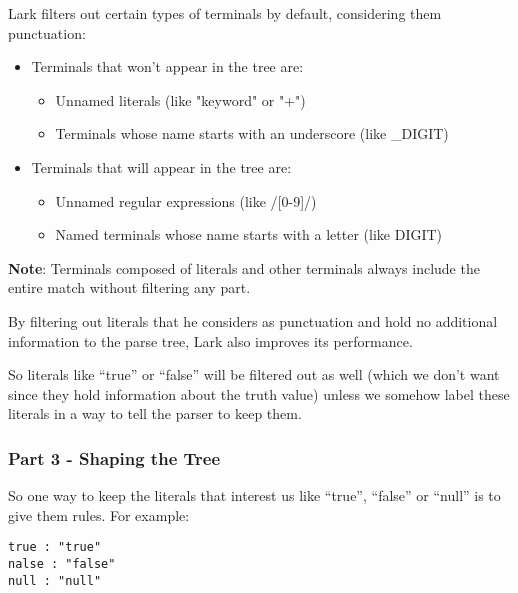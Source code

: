 \documentclass[12pt]{article}
\begin{document}
Lark filters out certain types of terminals by default, considering them punctuation:
\begin{itemize}
    \item Terminals that won't appear in the tree are:
    \begin{itemize}
        \item Unnamed literals (like "keyword" or "+")
        \item Terminals whose name starts with an underscore (like \_DIGIT)
    \end{itemize}
    \item Terminals that will appear in the tree are:
    \begin{itemize}
        \item Unnamed regular expressions (like /[0-9]/)
        \item Named terminals whose name starts with a letter (like DIGIT)
    \end{itemize}
\end{itemize}

\textbf{Note}: Terminals composed of literals and other terminals always include the entire match without filtering any part.

By filtering out literals that he considers as punctuation and hold no additional information to the parse tree, Lark also improves its performance.

So literals like “true” or “false” will be filtered out as well (which we don’t want since they hold information about the truth value) unless we somehow label these literals in a way to tell the parser to keep them.

\subsubsection{Part 3 - Shaping the Tree}

So one way to keep the literals that interest us like “true”, “false” or “null” is to give them rules. For example:

\begin{lstlisting}
true : "true"
nalse : "false"
null : "null"
\end{lstlisting}
\end{document}
